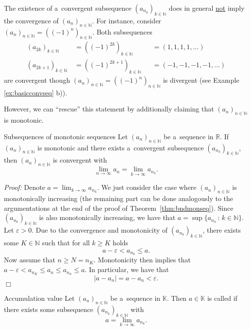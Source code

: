 \begin{Attention}{}
The existence of a~convergent subsequence $(a_{n_k})_{k\in\mathbb{N}}$ does in general \underline{not} imply the convergence of $(a_n)_{n\in\mathbb{N}}$. For instance, consider $(a_n)_{n\in\mathbb{N}}=((-1)^n)_{n\in\mathbb{N}}$. Both subsequences
\[\begin{aligned}
(a_{2k})_{k\in\mathbb{N}}\,&=((-1)^{2k})_{k\in\mathbb{N}}&&=(1,1,1,1,\ldots)\\
(a_{2k+1})_{k\in\mathbb{N}}\,&=((-1)^{2k+1})_{k\in\mathbb{N}}\!\!\!\!\!\!&&=(-1,-1,-1,-1,\ldots)
  \end{aligned}
\]
 are convergent though $(a_n)_{n\in\mathbb{N}}=((-1)^n)_{n\in\mathbb{N}}$ is divergent (see Example \ref{ex:basicconvseq} b)).
\end{Attention}
However, we can ``rescue'' this statement by additionally claiming that $(a_n)_{n\in\mathbb{N}}$ is monotonic.

\begin{Theorem}{Subsequences of monotonic sequences}
\label{thm:submon}
Let $(a_n)_{n\in\mathbb{N}}$ be a~sequence in $\mathbb{R}$. If $(a_n)_{n\in\mathbb{N}}$ is monotonic and there exists a~convergent subsequence $(a_{n_k})_{k\in\mathbb{N}}$, then $(a_n)_{n\in\mathbb{N}}$ is convergent with
\[\lim_{n\to\infty}a_n=\lim_{k\to\infty}a_{n_k}.\]
\end{Theorem}

{\em Proof:} Denote $a=\lim_{k\to\infty}a_{n_k}$. We just consider the case where $(a_n)_{n\in\mathbb{N}}$ is monotonically increasing 
(the remaining part can be done analogously to the argumentations at the end of the proof of Theorem~\ref{thm:bndmonseq}). 
Since $(a_{n_k})_{k\in\mathbb{N}}$ is also monotonically increasing, we have that $a=\sup\{a_{n_k}\,:\,k\in\mathbb{N}\}$. \\
Let $\varepsilon>0$. Due to the convergence and monotonicity of $(a_{n_k})_{k\in\mathbb{N}}$, there exists some $K\in\mathbb{N}$ such that for all $k\geq K$ holds
\[a-\varepsilon<a_{n_k}\leq a.\]
Now assume that $n\geq N=n_K$. Monotonicity then implies that $a-\varepsilon<a_{n_K}\leq a_n\leq a_{n_n}\leq a$. In particular, we have that
\[|a- a_n|=a-a_n<\varepsilon.\]\hfill$\Box$


\begin{Definition}{Accumulation value}
\label{def:accuPointNormedSpace}
Let $(a_n)_{n\in\mathbb{N}}$ be a~sequence in $\mathbb{K}$. Then $a\in \mathbb{K}$ is called  if there exists some subsequence $(a_{n_k})_{k\in\mathbb{N}}$ with
\[a=\lim_{k\to\infty}a_{n_k}.\]
\end{Definition}

